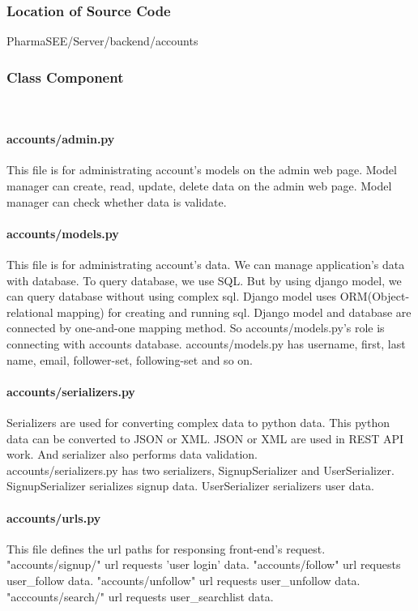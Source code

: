 \documentclass[conference]{IEEEtran}
\begin{document}
\subsubsection{Location of Source Code}PharmaSEE/Server/backend/accounts \\
\subsubsection{Class Component}\\
\paragraph{accounts/admin.py}
This file is for administrating account's models on the admin web page. Model manager can create, read, update, delete data on the admin web page. Model manager can check whether data is validate. 
\paragraph{accounts/models.py}
This file is for administrating account's data. We can manage application's data with database. To query database, we use SQL. But by using django model, we can query database without using complex sql. Django model uses ORM(Object-relational mapping) for creating and running sql. Django model and database are connected by one-and-one mapping method. So accounts/models.py's role is connecting with accounts database. accounts/models.py has username, first, last name, email, follower-set, following-set and so on. 
\paragraph{accounts/serializers.py}
Serializers are used for converting complex data to python data. This python data can be converted to JSON or XML. JSON or XML are used in REST API work. And serializer also performs data validation. \\
accounts/serializers.py has two serializers, SignupSerializer and UserSerializer. SignupSerializer serializes signup data. UserSerializer serializers user data. 
\paragraph{accounts/urls.py}
This file defines the url paths for responsing front-end's request. "accounts/signup/" url requests 'user login' data. "accounts/follow" url requests user\_follow data. "accounts/unfollow" url requests user\_unfollow data. "acccounts/search/" url requests user\_searchlist data.
\end{document}
